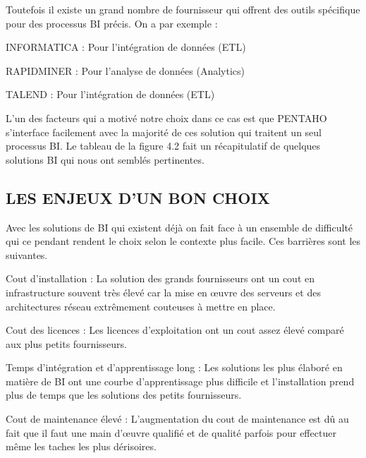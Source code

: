 Toutefois il existe un grand nombre de fournisseur qui offrent des outils spécifique pour des processus BI précis. On a par exemple : 
\begin{list}{•}{ }
   \item INFORMATICA : Pour l’intégration de données (ETL)
   \item RAPIDMINER : Pour l’analyse de données (Analytics)
   \item TALEND : Pour l’intégration de données (ETL)\\
\end{list}

L’un des facteurs qui a motivé notre choix dans ce cas est que PENTAHO s’interface facilement avec la majorité de ces solution qui traitent un seul processus BI. Le tableau de la figure 4.2 fait un récapitulatif de quelques solutions BI qui nous ont semblés pertinentes.\\


\subsection{LES ENJEUX D’UN BON CHOIX}

	Avec les solutions de BI qui existent déjà on fait face à un ensemble de difficulté qui ce pendant rendent le choix selon le contexte plus facile. Ces barrières sont les suivantes.
	\begin{list}{•}{ }
	   \item Cout d’installation : La solution des grands fournisseurs ont un cout en infrastructure souvent très élevé car la mise en œuvre des serveurs et des architectures réseau extrêmement couteuses à  mettre en place.
	   \item Cout des licences : Les licences d’exploitation ont un cout assez élevé comparé aux plus petits fournisseurs.
	   \item Temps d’intégration et d’apprentissage long : Les solutions les plus élaboré en matière de BI ont une courbe d’apprentissage plus difficile et l’installation prend plus de temps que les solutions des petits fournisseurs.
	   \item Cout de maintenance élevé : L’augmentation du cout de maintenance est dû au fait que il faut une main d’œuvre qualifié et de qualité parfois pour effectuer même les taches les plus dérisoires.\\
	\end{list}
	

